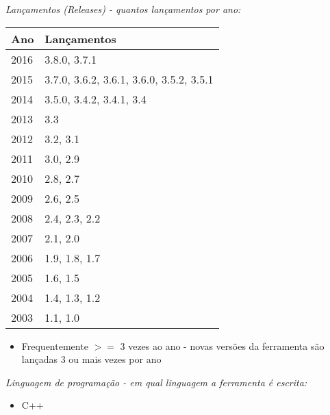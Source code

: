 \begin{description}

  \item {\it Lançamentos ({\it Releases}) - quantos lançamentos por ano:}
    \begin{table}[h!]
      \centering
      \begin{tabular}{| l | l |}
        \hline
        Ano  & Lançamentos                              \\
        \hline
        2016 & 3.8.0, 3.7.1                             \\
        2015 & 3.7.0, 3.6.2, 3.6.1, 3.6.0, 3.5.2, 3.5.1 \\
        2014 & 3.5.0, 3.4.2, 3.4.1, 3.4                 \\
        2013 & 3.3                                      \\
        2012 & 3.2, 3.1                                 \\
        2011 & 3.0, 2.9                                 \\
        2010 & 2.8, 2.7                                 \\
        2009 & 2.6, 2.5                                 \\
        2008 & 2.4, 2.3, 2.2                            \\
        2007 & 2.1, 2.0                                 \\
        2006 & 1.9, 1.8, 1.7                            \\
        2005 & 1.6, 1.5                                 \\
        2004 & 1.4, 1.3, 1.2                            \\
        2003 & 1.1, 1.0                                 \\
        \hline
      \end{tabular}
    \end{table}
    \begin{itemize}
      \item Frequentemente $>=$ 3 vezes ao ano - novas versões da ferramenta são lançadas 3 ou mais vezes por ano
    \end{itemize}

  \item {\it Linguagem de programação - em qual linguagem a ferramenta é escrita:}
    \begin{itemize}
      \item C++
    \end{itemize}

\end{description}

